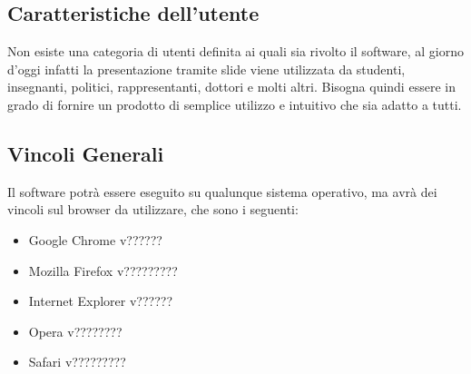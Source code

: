 \subsection{Caratteristiche dell'utente}
Non esiste una categoria di utenti definita ai quali sia rivolto il software, al giorno d'oggi infatti la presentazione tramite slide viene utilizzata da studenti, insegnanti, politici, rappresentanti, dottori e molti altri. Bisogna quindi essere in grado di fornire un prodotto di semplice utilizzo e intuitivo che sia adatto a tutti.

\subsection{Vincoli Generali}
Il software potrà essere eseguito su qualunque sistema operativo, ma avrà dei vincoli sul \gls{browser} da utilizzare, che sono i seguenti:
\begin{itemize}
	\item \gls{Google Chrome} v??????
	\item \gls{Mozilla Firefox} v?????????
	\item \gls{Internet Explorer} v??????
	\item \gls{Opera} v????????
	\item \gls{Safari} v?????????
\end{itemize}
